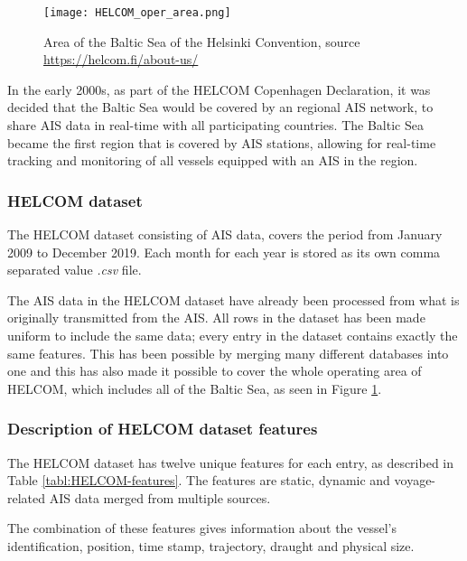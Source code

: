 \documentclass[../main.tex]{subfiles}
\begin{document}
\begin{figure}[H]
	\centering
	\texttt{[image: HELCOM\_oper\_area.png]}
	\caption{Area of the Baltic Sea of the Helsinki Convention, source \protect\url{https://helcom.fi/about-us/}}
	\label{fig:helcom-area}
\end{figure}

In the early 2000s, as part of the HELCOM Copenhagen Declaration, it was decided that the Baltic Sea would be covered by an regional AIS network, to share AIS data in real-time with all participating countries. The Baltic Sea became the first region that is covered by AIS stations, allowing for real-time tracking and monitoring of all vessels equipped with an AIS in the region.
\subsubsection{HELCOM dataset}

The HELCOM dataset consisting of AIS data, covers the period from January 2009 to December 2019. Each month for each year is stored as its own comma separated value \textit{.csv} file.

The AIS data in the HELCOM dataset have already been processed from what is originally transmitted from the AIS. All rows in the dataset has been made uniform to include the same data; every entry in the dataset contains exactly the same features. This has been possible by merging many different databases into one and this has also made it possible to cover the whole operating area of HELCOM, which includes all of the Baltic Sea, as seen in Figure \ref{fig:helcom-area}.

%
%


\subsubsection{Description of HELCOM dataset features}

The HELCOM dataset has twelve unique features for each entry, as described in Table \ref{tabl:HELCOM-features}. The features are static, dynamic and voyage-related AIS data merged from multiple sources.

The combination of these features gives information about the vessel's identification, position, time stamp, trajectory, draught and physical size. 
\end{document}

